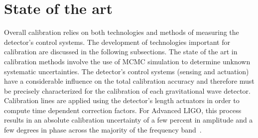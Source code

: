 
\section{State of the art}
Overall calibration relies on both technologies and methods of measuring the detector’s control systems. The development of technologies important for calibration are discussed in the following subsections. The state of the art in calibration methods involve the use of MCMC simulation to determine unknown systematic uncertainties.
\pagebreak
The detector's control systems (sensing and actuation) have a considerable influence on the total calibration accuracy and therefore must be precisely characterized for the calibration of each gravitational wave detector.
Calibration lines are applied using the detector's length actuators in order to compute time dependent correction factors.
For Advanced LIGO, this process results in an absolute calibration uncertainty of a few percent in amplitude and a few degrees in phase across the majority of the frequency band~\cite{PhysRevD.96.102001}.

